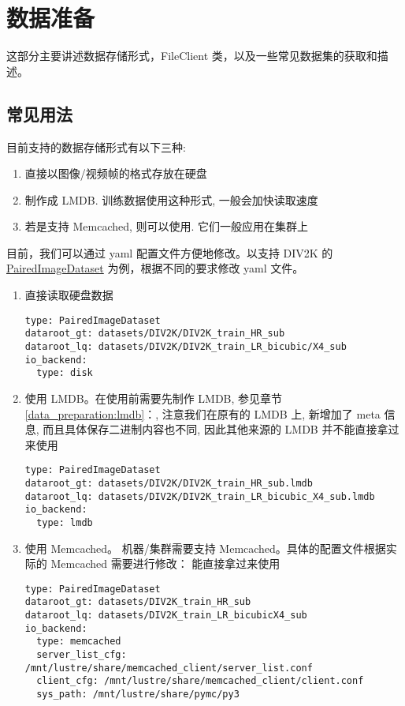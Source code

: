 \documentclass[../main.tex]{subfiles}
\begin{document}
\chapter{数据准备}\label{chapter:data_preparation}
\vspace{-2cm}
这部分主要讲述数据存储形式，FileClient 类，以及一些常见数据集的获取和描述。

\section{常见用法}\label{data_preparation:common_use}

目前支持的数据存储形式有以下三种:

\begin{enumerate}
    \item 直接以图像/视频帧的格式存放在硬盘
    \item 制作成 LMDB. 训练数据使用这种形式, 一般会加快读取速度
    \item 若是支持 Memcached, 则可以使用. 它们一般应用在集群上
\end{enumerate}

目前，我们可以通过 yaml 配置文件方便地修改。以支持 DIV2K 的 \href{https://github.com/XPixelGroup/BasicSR/blob/master/basicsr/data/paired_image_dataset.py}{PairedImageDataset} 为例，根据不同的要求修改 yaml 文件。

\begin{enumerate}
    \item 直接读取硬盘数据
          \begin{verbatim}
type: PairedImageDataset
dataroot_gt: datasets/DIV2K/DIV2K_train_HR_sub
dataroot_lq: datasets/DIV2K/DIV2K_train_LR_bicubic/X4_sub
io_backend:
  type: disk
\end{verbatim}

    \item 使用 LMDB。在使用前需要先制作 LMDB, 参见章节\ref{data_preparation:lmdb}：, 注意我们在原有的 LMDB 上, 新增加了 meta 信息, 而且具体保存二进制内容也不同, 因此其他来源的 LMDB 并不能直接拿过来使用
          \begin{verbatim}
type: PairedImageDataset
dataroot_gt: datasets/DIV2K/DIV2K_train_HR_sub.lmdb
dataroot_lq: datasets/DIV2K/DIV2K_train_LR_bicubic_X4_sub.lmdb
io_backend:
  type: lmdb
\end{verbatim}

    \item 使用 Memcached。 机器/集群需要支持 Memcached。具体的配置文件根据实际的 Memcached 需要进行修改：
          能直接拿过来使用
          \begin{verbatim}
type: PairedImageDataset
dataroot_gt: datasets/DIV2K_train_HR_sub
dataroot_lq: datasets/DIV2K_train_LR_bicubicX4_sub
io_backend:
  type: memcached
  server_list_cfg: /mnt/lustre/share/memcached_client/server_list.conf
  client_cfg: /mnt/lustre/share/memcached_client/client.conf
  sys_path: /mnt/lustre/share/pymc/py3
\end{verbatim}
\end{enumerate}
\end{document}
